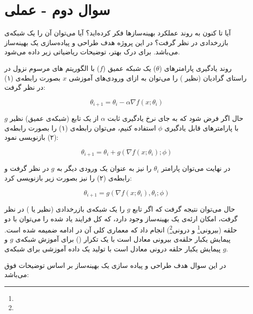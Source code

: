 \section{سوال دوم - عملی}

آیا تا کنون به روند عملکرد بهینه‌سازها فکر کرده‌اید؟ آیا می‌توان آن را یک شبکه‌ی بازرخدادی در نظر گرفت؟ در این پروژه هدف طراحی و پیاده‌سازی یک بهینه‌ساز می‌باشد. برای درک بهتر، توضیحات ریاضیاتی زیر داده می‌شود.



روند یادگیری پارامترهای ($\theta$) یک شبکه عمیق ($f$) با الگوریتم های مرسوم نزول در راستای گرادیان (نظیر ) را می‌توان به ازای ورودی‌های آموزشی $x$ بصورت رابطه‌ی (۱) در نظر گرفت:

\begin{equation}
	\theta_{i+1} = \theta_i - \alpha \nabla f(x; \theta_i)
\end{equation}

حال اگر فرض شود که به جای نرخ یادگیری ثابت $\alpha$ از یک تابع (شبکه‌ی عمیق) نظیر $g$ با پارامترهای قابل یادگیری $\phi$ استفاده کنیم، می‌توان رابطه‌ی (۱) را بصورت رابطه‌ی (۲) بازنویسی نمود:

\begin{equation}
	\theta_{i+1} = \theta_i + g(\nabla f(x; \theta_i); \phi)
\end{equation}

در نهایت می‌توان پارامتر $\theta_i$ را نیز به عنوان یک ورودی دیگر به $g$ در نظر گرفت و رابطه‌ی (۲) را نیز بصورت زیر بازنویسی کرد:

\begin{equation}
	\theta_{i+1} = g(\nabla f(x; \theta_i), \theta_i; \phi)
\end{equation}

حال می‌توان نتیجه گرفت که اگر تابع $g$ را یک شبکه‌ی بازرخدادی (نظیر  یا ) در نظر گرفت، امکان ارئه‌ی یک بهینه‌ساز وجود دارد، که کل فرایند یاد شده را می‌توان با دو حلقه (بیرونی\footnote{} و درونی\footnote{}) انجام داد که معماری کلی آن در ادامه ضمیمه شده است. پیمایش یکبار حلقه‌ی بیرونی معادل است با یک تکرار () برای آموزش شبکه‌ی $g$ و پیمایش یکبار حلقه درونی معادل است با تولید یک داده آموزشی برای شبکه‌ی $g$.




در این سوال هدف طراحی و پیاده سازی یک بهینه‌ساز بر اساس توضیحات فوق می‌باشد:

